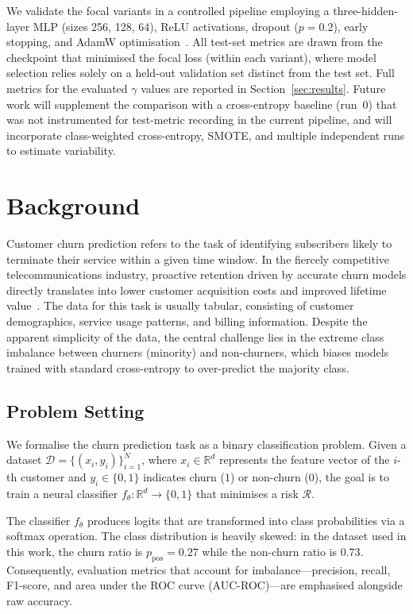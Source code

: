 \documentclass[11pt,a4paper]{article}
\begin{document}
We validate the focal variants in a controlled pipeline employing a three-hidden-layer MLP (sizes 256, 128, 64), ReLU activations, dropout ($p=0.2$), early stopping, and AdamW optimisation~\cite{kingma2014adam}. All test-set metrics are drawn from the checkpoint that minimised the focal loss (within each variant), where model selection relies solely on a held-out validation set distinct from the test set. Full metrics for the evaluated $\gamma$ values are reported in Section~\ref{sec:results}. Future work will supplement the comparison with a cross-entropy baseline (run~0) that was not instrumented for test-metric recording in the current pipeline, and will incorporate class-weighted cross-entropy, SMOTE, and multiple independent runs to estimate variability.

\section{Background}
\label{sec:background}

Customer churn prediction refers to the task of identifying subscribers likely to terminate their service within a given time window. In the fiercely competitive telecommunications industry, proactive retention driven by accurate churn models directly translates into lower customer acquisition costs and improved lifetime value~\cite{fatima2024churn}. The data for this task is usually tabular, consisting of customer demographics, service usage patterns, and billing information. Despite the apparent simplicity of the data, the central challenge lies in the extreme class imbalance between churners (minority) and non-churners, which biases models trained with standard cross-entropy to over-predict the majority class.

\subsection{Problem Setting}
\label{subsec:background-problem}
We formalise the churn prediction task as a binary classification problem. Given a dataset
$\mathcal{D} = \{(x_i,y_i)\}_{i=1}^N$,
where $x_i\in\mathbb{R}^d$ represents the feature vector of the $i$-th customer and $y_i\in\{0,1\}$ indicates churn ($1$) or non-churn ($0$), the goal is to train a neural classifier
$f_\theta:\mathbb{R}^d\to\{0,1\}$
that minimises a risk $\mathcal{R}$.

The classifier $f_\theta$ produces logits that are transformed into class probabilities via a softmax operation. The class distribution is heavily skewed: in the dataset used in this work, the churn ratio is $p_\text{pos}=0.27$ while the non-churn ratio is $0.73$. Consequently, evaluation metrics that account for imbalance---precision, recall, F1-score, and area under the ROC curve (AUC-ROC)---are emphasised alongside raw accuracy.
\end{document}
